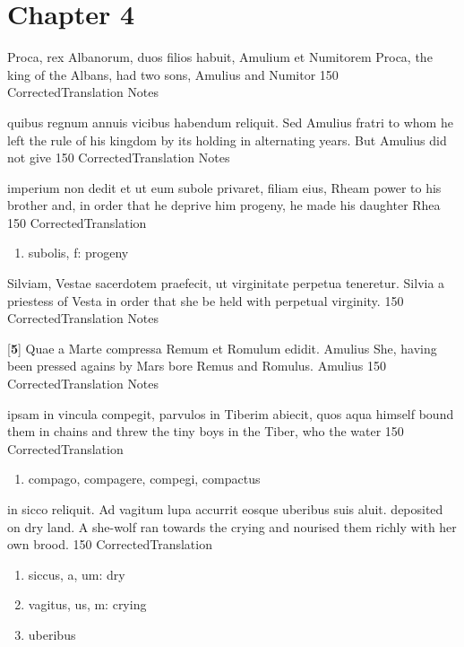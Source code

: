 \chapter*{Chapter 4} %
\label{sec:chapter_4}

\latline
  {Proca, rex Albanorum, duos filios habuit, Amulium et Numitorem }
  { Proca, the king of the Albans, had two sons, Amulius and Numitor }
  {150}
  { CorrectedTranslation }
  { Notes }


\latline
  {quibus regnum annuis vicibus habendum reliquit. Sed Amulius fratri}
  { to whom he left the rule of his kingdom by its holding in alternating years.  But Amulius did not give }
  {150}
  { CorrectedTranslation }
  { Notes }


\latline
  {imperium non dedit et ut eum subole privaret, filiam eius, Rheam }
  { power to his brother and, in order that he deprive him progeny, he made his daughter Rhea   }
  {150}
  { CorrectedTranslation }
  { \begin{enumerate}
  	\item subolis, f:  progeny
  \end{enumerate} }


\latline
  {Silviam, Vestae sacerdotem praefecit, ut virginitate perpetua teneretur.}
  { Silvia a priestess of Vesta in order that she be held with perpetual virginity. }
  {150}
  { CorrectedTranslation }
  { Notes }


\latline
  {[\textbf{5}] Quae a Marte compressa Remum et Romulum edidit.  Amulius }
  { She, having been pressed agains by Mars bore Remus and Romulus.  Amulius }
  {150}
  { CorrectedTranslation }
  { Notes }


\latline
  {ipsam in vincula compegit, parvulos in Tiberim abiecit, quos aqua }
  { himself bound them in chains and threw the tiny boys in the Tiber, who the water   }
  {150}
  { CorrectedTranslation }
  { \begin{enumerate}
  	\item compago, compagere, compegi, compactus
  \end{enumerate} }


\latline
  {in sicco reliquit.  Ad vagitum lupa accurrit eosque uberibus suis aluit. }
  { deposited on dry land.  A she-wolf ran towards the crying and nourised them richly with her own brood.  }
  {150}
  { CorrectedTranslation }
  { \begin{enumerate}
  	\item siccus, a, um:  dry
  	\item vagitus, us, m:  crying
  	\item uberibus
  \end{enumerate} }


